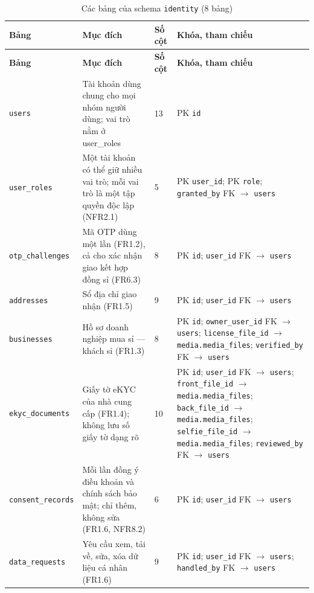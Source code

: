 \begingroup
\tblsetup\footnotesize\renewcommand{\arraystretch}{1.1}
\begin{longtable}{L{3.20cm} L{5.60cm} L{1.10cm} L{5.00cm}}
\caption{Các bảng của schema \texttt{identity} (8 bảng)}
\label{tab:db-identity} \\
\toprule
{}
\textbf{Bảng} & \textbf{Mục đích} & \textbf{Số cột} & \textbf{Khóa, tham chiếu} \\
\midrule
\endfirsthead
\toprule
{}
\textbf{Bảng} & \textbf{Mục đích} & \textbf{Số cột} & \textbf{Khóa, tham chiếu} \\
\midrule
\endhead
\bottomrule
\endfoot
\texttt{users} & Tài khoản dùng chung cho mọi nhóm người dùng; vai trò nằm ở user\_roles & 13 & PK \texttt{id} \\
\texttt{user\_\allowbreak{}roles} & Một tài khoản có thể giữ nhiều vai trò; mỗi vai trò là một tập quyền độc lập (NFR2.1) & 5 & PK \texttt{user\_\allowbreak{}id}; PK \texttt{role}; \texttt{granted\_\allowbreak{}by} FK $\to$ \texttt{users} \\
\texttt{otp\_\allowbreak{}challenges} & Mã OTP dùng một lần (FR1.2), cả cho xác nhận giao kết hợp đồng sỉ (FR6.3) & 8 & PK \texttt{id}; \texttt{user\_\allowbreak{}id} FK $\to$ \texttt{users} \\
\texttt{addresses} & Sổ địa chỉ giao nhận (FR1.5) & 9 & PK \texttt{id}; \texttt{user\_\allowbreak{}id} FK $\to$ \texttt{users} \\
\texttt{businesses} & Hồ sơ doanh nghiệp mua sỉ — khách sỉ (FR1.3) & 8 & PK \texttt{id}; \texttt{owner\_\allowbreak{}user\_\allowbreak{}id} FK $\to$ \texttt{users}; \texttt{license\_\allowbreak{}file\_\allowbreak{}id} $\to$ \texttt{media.media\_\allowbreak{}files}; \texttt{verified\_\allowbreak{}by} FK $\to$ \texttt{users} \\
\texttt{ekyc\_\allowbreak{}documents} & Giấy tờ eKYC của nhà cung cấp (FR1.4); không lưu số giấy tờ dạng rõ & 10 & PK \texttt{id}; \texttt{user\_\allowbreak{}id} FK $\to$ \texttt{users}; \texttt{front\_\allowbreak{}file\_\allowbreak{}id} $\to$ \texttt{media.media\_\allowbreak{}files}; \texttt{back\_\allowbreak{}file\_\allowbreak{}id} $\to$ \texttt{media.media\_\allowbreak{}files}; \texttt{selfie\_\allowbreak{}file\_\allowbreak{}id} $\to$ \texttt{media.media\_\allowbreak{}files}; \texttt{reviewed\_\allowbreak{}by} FK $\to$ \texttt{users} \\
\texttt{consent\_\allowbreak{}records} & Mỗi lần đồng ý điều khoản và chính sách bảo mật; chỉ thêm, không sửa (FR1.6, NFR8.2) & 6 & PK \texttt{id}; \texttt{user\_\allowbreak{}id} FK $\to$ \texttt{users} \\
\texttt{data\_\allowbreak{}requests} & Yêu cầu xem, tải về, sửa, xóa dữ liệu cá nhân (FR1.6) & 9 & PK \texttt{id}; \texttt{user\_\allowbreak{}id} FK $\to$ \texttt{users}; \texttt{handled\_\allowbreak{}by} FK $\to$ \texttt{users} \\
\end{longtable}
\endgroup

